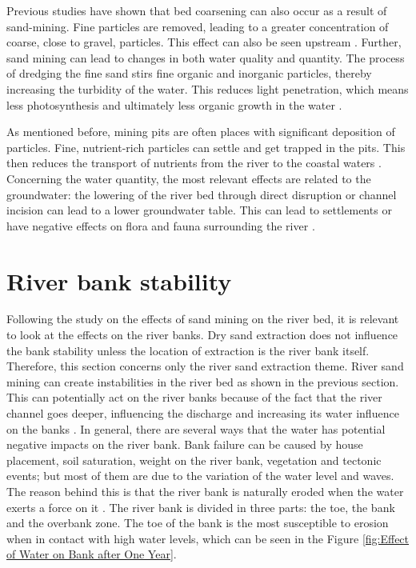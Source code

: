 Previous studies have shown that bed coarsening can also occur as a result of sand-mining. Fine particles are removed, leading to a greater concentration of coarse, close to gravel, particles. This effect can also be seen upstream \autocite{sand-mining-boek}. Further, sand mining can lead to changes in both water quality and quantity. The process of dredging the fine sand stirs fine organic and inorganic particles, thereby increasing the turbidity of the water. This reduces light penetration, which means less photosynthesis and ultimately less organic growth in the water \autocite{sharipEffectsSeasonSand2014}.

As mentioned before, mining pits are often places with significant deposition of particles. Fine, nutrient-rich particles can settle and get trapped in the pits. This then reduces the transport of nutrients from the river to the coastal waters \autocite{sand-mining-boek}. Concerning the water quantity, the most relevant effects are related to the groundwater: the lowering of the river bed through direct disruption or channel incision can lead to a lower groundwater table. This can lead to settlements or have negative effects on flora and fauna surrounding the river \autocite{rentierEnvironmentalImpactsRiver2022}.

\section{River bank stability}
Following the study on the effects of sand mining on the river bed, it is relevant to look at the effects on the river banks. Dry sand extraction does not influence the bank stability unless the location of extraction is the river bank itself. Therefore, this section concerns only the river sand extraction theme.
River sand mining can create instabilities in the river bed as shown in the previous section. This can potentially act on the river banks because of the fact that the river channel goes deeper, influencing the discharge and increasing its water influence on the banks \autocite{hackneyRiverBankInstability2020}. In general, there are several ways that the water has potential negative impacts on the river bank. Bank failure can be caused by house placement, soil saturation, weight on the river bank, vegetation and tectonic events; but most of them are due to the variation of the water level and waves. The reason behind this is that the river bank is naturally eroded when the water exerts a force on it \autocite{governmentofsouthaustraliaRiverbankCollapse2024}.
The river bank is divided in three parts: the toe, the bank and the overbank zone. The toe of the bank is the most susceptible to erosion when in contact with high water levels, which can be seen in the Figure \ref{fig:Effect of Water on Bank after One Year}.

